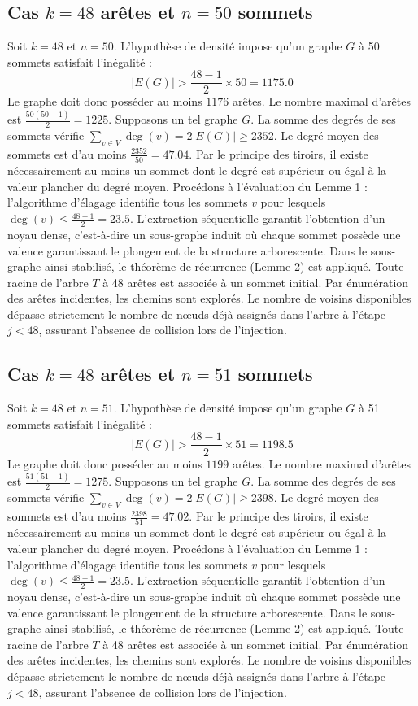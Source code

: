 \documentclass[12pt,a4paper]{article}
\begin{document}
\subsection{Cas $k = 48$ arêtes et $n = 50$ sommets}
Soit $k = 48$ et $n = 50$. L'hypothèse de densité impose qu'un graphe $G$ à 50 sommets satisfait l'inégalité :
$$ |E(G)| > \frac{48-1}{2} \times 50 = 1175.0 $$
Le graphe doit donc posséder au moins $1176$ arêtes. Le nombre maximal d'arêtes est $\frac{50(50-1)}{2} = 1225$.
Supposons un tel graphe $G$. La somme des degrés de ses sommets vérifie $\sum_{v \in V} \deg(v) = 2|E(G)| \geq 2352$.
Le degré moyen des sommets est d'au moins $\frac{2352}{50} = 47.04$.
Par le principe des tiroirs, il existe nécessairement au moins un sommet dont le degré est supérieur ou égal à la valeur plancher du degré moyen.
Procédons à l'évaluation du Lemme 1 : l'algorithme d'élagage identifie tous les sommets $v$ pour lesquels $\deg(v) \leq \frac{48-1}{2} = 23.5$.
L'extraction séquentielle garantit l'obtention d'un noyau dense, c'est-à-dire un sous-graphe induit où chaque sommet possède une valence garantissant le plongement de la structure arborescente.
Dans le sous-graphe ainsi stabilisé, le théorème de récurrence (Lemme 2) est appliqué. Toute racine de l'arbre $T$ à 48 arêtes est associée à un sommet initial. Par énumération des arêtes incidentes, les chemins sont explorés. Le nombre de voisins disponibles dépasse strictement le nombre de nœuds déjà assignés dans l'arbre à l'étape $j < 48$, assurant l'absence de collision lors de l'injection.

\subsection{Cas $k = 48$ arêtes et $n = 51$ sommets}
Soit $k = 48$ et $n = 51$. L'hypothèse de densité impose qu'un graphe $G$ à 51 sommets satisfait l'inégalité :
$$ |E(G)| > \frac{48-1}{2} \times 51 = 1198.5 $$
Le graphe doit donc posséder au moins $1199$ arêtes. Le nombre maximal d'arêtes est $\frac{51(51-1)}{2} = 1275$.
Supposons un tel graphe $G$. La somme des degrés de ses sommets vérifie $\sum_{v \in V} \deg(v) = 2|E(G)| \geq 2398$.
Le degré moyen des sommets est d'au moins $\frac{2398}{51} = 47.02$.
Par le principe des tiroirs, il existe nécessairement au moins un sommet dont le degré est supérieur ou égal à la valeur plancher du degré moyen.
Procédons à l'évaluation du Lemme 1 : l'algorithme d'élagage identifie tous les sommets $v$ pour lesquels $\deg(v) \leq \frac{48-1}{2} = 23.5$.
L'extraction séquentielle garantit l'obtention d'un noyau dense, c'est-à-dire un sous-graphe induit où chaque sommet possède une valence garantissant le plongement de la structure arborescente.
Dans le sous-graphe ainsi stabilisé, le théorème de récurrence (Lemme 2) est appliqué. Toute racine de l'arbre $T$ à 48 arêtes est associée à un sommet initial. Par énumération des arêtes incidentes, les chemins sont explorés. Le nombre de voisins disponibles dépasse strictement le nombre de nœuds déjà assignés dans l'arbre à l'étape $j < 48$, assurant l'absence de collision lors de l'injection.
\end{document}
